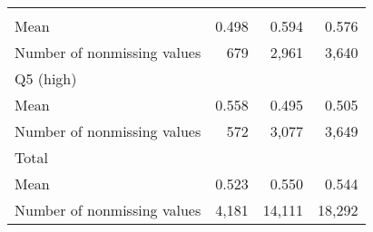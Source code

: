 \documentclass{article}
\begin{document}
\begin{table}[!h]
\begin{tabular}{llll}
  \multicolumn{1}{r}{} \\
\multicolumn{1}{l}{\hspace{2em}Mean} &
  \multicolumn{1}{|r}{0.498} &
  \multicolumn{1}{r}{0.594} &
  \multicolumn{1}{r}{0.576} \\
\multicolumn{1}{l}{\hspace{2em}Number of nonmissing values} &
  \multicolumn{1}{|r}{679} &
  \multicolumn{1}{r}{2,961} &
  \multicolumn{1}{r}{3,640} \\
\multicolumn{1}{l}{\hspace{1em}Q5 (high)} &
  \multicolumn{1}{|r}{} &
  \multicolumn{1}{r}{} &
  \multicolumn{1}{r}{} \\
\multicolumn{1}{l}{\hspace{2em}Mean} &
  \multicolumn{1}{|r}{0.558} &
  \multicolumn{1}{r}{0.495} &
  \multicolumn{1}{r}{0.505} \\
\multicolumn{1}{l}{\hspace{2em}Number of nonmissing values} &
  \multicolumn{1}{|r}{572} &
  \multicolumn{1}{r}{3,077} &
  \multicolumn{1}{r}{3,649} \\
\multicolumn{1}{l}{\hspace{1em}Total} &
  \multicolumn{1}{|r}{} &
  \multicolumn{1}{r}{} &
  \multicolumn{1}{r}{} \\
\multicolumn{1}{l}{\hspace{2em}Mean} &
  \multicolumn{1}{|r}{0.523} &
  \multicolumn{1}{r}{0.550} &
  \multicolumn{1}{r}{0.544} \\
\multicolumn{1}{l}{\hspace{2em}Number of nonmissing values} &
  \multicolumn{1}{|r}{4,181} &
  \multicolumn{1}{r}{14,111} &
  \multicolumn{1}{r}{18,292} \\
\cline{1-4}
\end{tabular}
\end{table}
\end{document}
